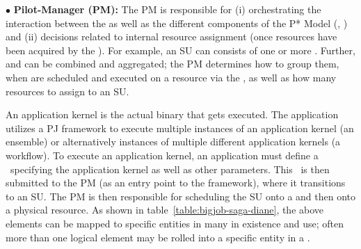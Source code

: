 \documentclass{sig-alternate}
\begin{document}
\noindent$\bullet$ \textbf{Pilot-Manager (PM):} The PM is responsible for (i)
  orchestrating the interaction between the \pilots as well as the
  different components of the P* Model (\cus, \sus) and (ii) decisions
  related to internal resource assignment (once resources have been
  acquired by the \pilotjob).  For example, an SU can consists of one
  or more \cus. Further, \cus and \sus can be combined and aggregated;
  the PM determines how to group them, when \sus are scheduled and
  executed on a resource via the \pilot, as well as how many resources
  to assign to an SU.

An application kernel is the actual binary that gets executed.  The
application utilizes a PJ framework to execute multiple instances of
an application kernel (an ensemble) or alternatively instances of
multiple different application kernels (a workflow).  To execute an
application kernel, an application must define a \cu \ specifying the
application kernel as well as other parameters. This \cu \ is then
submitted to the PM (as an entry point to the
\pilotjob framework), where it transitions to an SU. The PM is then
responsible for scheduling the SU onto a \pilot and then onto a
physical resource.  As shown in table~\ref{table:bigjob-saga-diane}, 
the above elements can be mapped to specific entities in many \pilotjobs 
in existence and use; often more than one logical element may be rolled 
into a specific entity in a \pilotjob.

% 
% 


\end{document}

